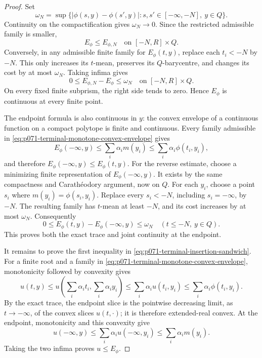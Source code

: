 \begin{proof}
Set
\[
 \omega_N=\sup\{
   |\phi(s,y)-\phi(s',y)|:
   s,s'\in[-\infty,-N],\ y\in Q\}.
\]
Continuity on the compactification gives \(\omega_N\to0\).  Since the
restricted admissible family is smaller,
\[
                         E_\phi\leq E_{\phi,N}
                         \quad\text{on }[-N,R]\times Q.
\]
Conversely, in any admissible finite family for \(E_\phi(t,y)\), replace
each \(t_i<-N\) by \(-N\).  This only increases its \(t\)-mean, preserves
its \(Q\)-barycentre, and changes its cost by at most \(\omega_N\).
Taking infima gives
\begin{equation}
 0\leq E_{\phi,N}-E_\phi\leq\omega_N
 \quad\text{on }[-N,R]\times Q.
 \label{eq:p071-terminal-finite-truncation}
\end{equation}
On every fixed finite subprism, the right side tends to zero.  Hence
\(E_\phi\) is continuous at every finite point.

The endpoint formula is also continuous in \(y\): the convex envelope of a
continuous function on a compact polytope is finite and continuous.  Every
family admissible in
\eqref{eq:p071-terminal-monotone-convex-envelope} gives
\[
 E_\phi(-\infty,y)
 \leq\sum_i\alpha_i m(y_i)
 \leq\sum_i\alpha_i\phi(t_i,y_i),
\]
and therefore \(E_\phi(-\infty,y)\leq E_\phi(t,y)\).
For the reverse estimate, choose a minimizing finite representation of
\(E_\phi(-\infty,y)\).  It exists by the same compactness and Carath\'eodory
argument, now on \(Q\).  For each \(y_i\), choose a point \(s_i\) where
\(m(y_i)=\phi(s_i,y_i)\).  Replace every
\(s_i<-N\), including \(s_i=-\infty\), by \(-N\).  The resulting family
has \(t\)-mean at least \(-N\), and its cost increases by at most
\(\omega_N\).  Consequently
\begin{equation}
 0\leq E_\phi(t,y)-E_\phi(-\infty,y)\leq\omega_N
 \quad(t\leq-N,\ y\in Q).
 \label{eq:p071-terminal-uniform-endpoint}
\end{equation}
This proves both the exact trace and joint continuity at the endpoint.

It remains to prove the first inequality in
\eqref{eq:p071-terminal-insertion-sandwich}.  For a finite root and a family
in
\eqref{eq:p071-terminal-monotone-convex-envelope}, monotonicity followed by
convexity gives
\[
 u(t,y)\leq
 u\left(\sum_i\alpha_i t_i,\sum_i\alpha_i y_i\right)
 \leq\sum_i\alpha_i u(t_i,y_i)
 \leq\sum_i\alpha_i\phi(t_i,y_i).
\]
By the exact trace, the endpoint slice is the pointwise decreasing limit, as
\(t\to-\infty\), of the convex slices \(u(t,\cdot)\); it is therefore
extended-real convex.  At the endpoint, monotonicity and this convexity give
\[
 u(-\infty,y)\leq
 \sum_i\alpha_i u(-\infty,y_i)
 \leq\sum_i\alpha_i m(y_i).
\]
Taking the two infima proves \(u\leq E_\phi\).


\end{proof}
